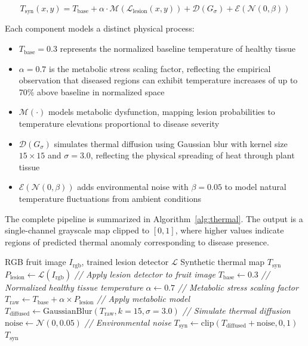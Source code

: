 \documentclass[utf8]{FrontiersinHarvard} %
\begin{document}
\begin{equation}
    T_{\text{syn}}(x,y) = T_{\text{base}} + \alpha \cdot \mathcal{M}(\mathcal{L}_{\text{lesion}}(x,y)) + \mathcal{D}(G_{\sigma}) + \mathcal{E}(\mathcal{N}(0,\beta))
    \label{eq:thermal_synthesis}
\end{equation}

Each component models a distinct physical process:
\begin{itemize}
    \item $T_{\text{base}} = 0.3$ represents the normalized baseline temperature of healthy tissue
    \item $\alpha = 0.7$ is the metabolic stress scaling factor, reflecting the empirical observation that diseased regions can exhibit temperature increases of up to 70\% above baseline in normalized space \cite{mahlein2016}
    \item $\mathcal{M}(\cdot)$ models metabolic dysfunction, mapping lesion probabilities to temperature elevations proportional to disease severity
    \item $\mathcal{D}(G_{\sigma})$ simulates thermal diffusion using Gaussian blur with kernel size $15 \times 15$ and $\sigma = 3.0$, reflecting the physical spreading of heat through plant tissue
    \item $\mathcal{E}(\mathcal{N}(0,\beta))$ adds environmental noise with $\beta = 0.05$ to model natural temperature fluctuations from ambient conditions
\end{itemize}

The complete pipeline is summarized in Algorithm~\ref{alg:thermal}. The output is a single-channel grayscale map clipped to $[0, 1]$, where higher values indicate regions of predicted thermal anomaly corresponding to disease presence.

\begin{algorithm}[H]
    \caption{Thermal Synthesis Pipeline}
    \label{alg:thermal}
    \begin{algorithmic}[1]
        \REQUIRE RGB fruit image $I_{\text{rgb}}$, trained lesion detector $\mathcal{L}$
        \ENSURE Synthetic thermal map $T_{\text{syn}}$
        \STATE $P_{\text{lesion}} \leftarrow \mathcal{L}(I_{\text{rgb}})$ \hfill \textit{// Apply lesion detector to fruit image}
        \STATE $T_{\text{base}} \leftarrow 0.3$ \hfill \textit{// Normalized healthy tissue temperature}
        \STATE $\alpha \leftarrow 0.7$ \hfill \textit{// Metabolic stress scaling factor}
        \STATE $T_{\text{raw}} \leftarrow T_{\text{base}} + \alpha \times P_{\text{lesion}}$ \hfill \textit{// Apply metabolic model}
        \STATE $T_{\text{diffused}} \leftarrow \text{GaussianBlur}(T_{\text{raw}}, k{=}15, \sigma{=}3.0)$ \hfill \textit{// Simulate thermal diffusion}
        \STATE $\text{noise} \leftarrow \mathcal{N}(0, 0.05)$ \hfill \textit{// Environmental noise}
        \STATE $T_{\text{syn}} \leftarrow \text{clip}(T_{\text{diffused}} + \text{noise}, 0, 1)$
        \RETURN $T_{\text{syn}}$
    \end{algorithmic}
\end{algorithm}
\end{document}
